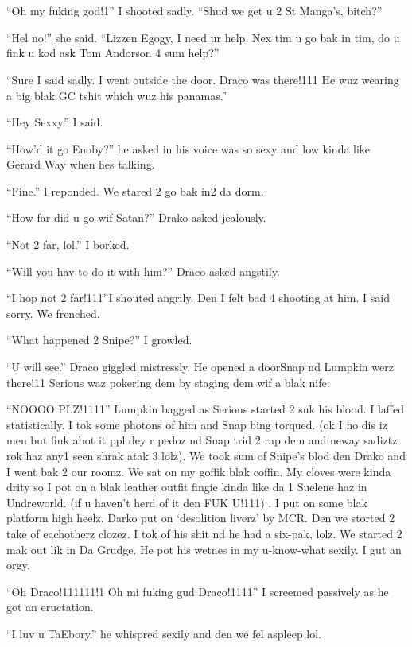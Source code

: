\section{\chaptername~\thesection}


\XXX{\Xfill 666\Xfill}

\enquote{Oh my fuking god!1} I shooted sadly. \enquote{Shud we get u 2 St Manga's, bitch?}

\enquote{Hel no!} she said. \enquote{Lizzen Egogy, I need ur help. Nex tim u go bak in tim, do u fink u kod ask Tom Andorson 4 sum help?}

\enquote{Sure I said sadly. I went outside the door. Draco was there!111 He wuz wearing a big blak GC tshit which wuz his panamas.}

\enquote{Hey Sexxy.} I said.

\enquote{How'd it go Enoby?} he asked in his voice was so sexy and low kinda like Gerard Way when hes talking.

\enquote{Fine.} I reponded. We stared 2 go bak in2 da dorm.

\enquote{How far did u go wif Satan?} Drako asked jealously.

\enquote{Not 2 far, lol.} I borked.

\enquote{Will you hav to do it with him?} Draco asked angstily.

\enquote{I hop not 2 far!111}\@ I shouted angrily. Den I felt bad 4 shooting at him. I said sorry. We frenched.

\enquote{What happened 2 Snipe?} I growled.

\enquote{U will see.} Draco giggled mistressly. He opened a door\dotfill\newline\phantom{}\dotfill Snap nd Lumpkin werz there!11 Serious waz pokering dem by staging dem wif a blak nife.

\enquote{NOOOO PLZ!1111} Lumpkin bagged as Serious started 2 suk his blood. I laffed statistically. I tok some photons of him and Snap bing torqued. (ok I no dis iz men but fink abot it ppl dey r pedoz nd Snap trid 2 rap dem and neway sadiztz rok haz any1 seen shrak atak 3 lolz). We took sum of Snipe's blod den Drako and I went bak 2 our roomz. We sat on my goffik blak coffin. My cloves were kinda drity so I pot on a blak leather outfit fingie kinda like da 1 Suelene haz in Undreworld. (if u haven't herd of it den FUK U!111) . I put on some blak platform high heelz. Darko put on `desolition liverz' by MCR. Den\dotfill\newline
we storted 2 take of eachotherz clozez. I tok of his shit nd he had a six-pak, lolz. We started 2 mak out lik in Da Grudge. He pot his wetnes in my u-know-what sexily. I gut an orgy.

\begin{sloppypar}
    \enquote{Oh Draco!111111!\@1 Oh mi fuking gud Draco!1111} I screemed passively as he got an eructation.
\end{sloppypar}

\enquote{I luv u TaEbory.} he whispred sexily and den we fel aspleep lol.
